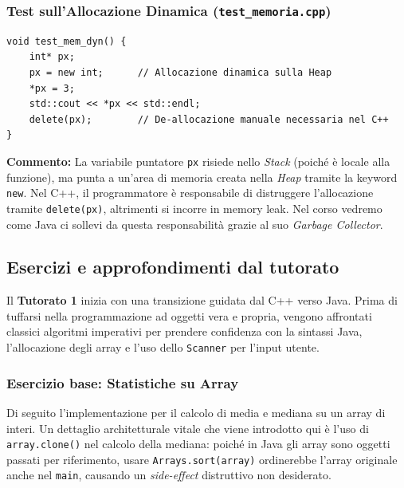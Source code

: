 \documentclass[12pt, a4paper]{article}
\begin{document}
\subsubsection{Test sull'Allocazione Dinamica (\texttt{test\_memoria.cpp})}
\begin{verbatim}
void test_mem_dyn() {
    int* px;
    px = new int;      // Allocazione dinamica sulla Heap
    *px = 3;
    std::cout << *px << std::endl;
    delete(px);        // De-allocazione manuale necessaria nel C++
}
\end{verbatim}
\textbf{Commento:} La variabile puntatore \texttt{px} risiede nello \textit{Stack} (poiché è locale alla funzione), ma punta a un'area di memoria creata nella \textit{Heap} tramite la keyword \texttt{new}. Nel C++, il programmatore è responsabile di distruggere l'allocazione tramite \texttt{delete(px)}, altrimenti si incorre in memory leak. Nel corso vedremo come Java ci sollevi da questa responsabilità grazie al suo \textit{Garbage Collector}.

\subsection{Esercizi e approfondimenti dal tutorato}
Il \textbf{Tutorato 1} inizia con una transizione guidata dal C++ verso Java. Prima di tuffarsi nella programmazione ad oggetti vera e propria, vengono affrontati classici algoritmi imperativi per prendere confidenza con la sintassi Java, l'allocazione degli array e l'uso dello \texttt{Scanner} per l'input utente.

\subsubsection{Esercizio base: Statistiche su Array}
Di seguito l'implementazione per il calcolo di media e mediana su un array di interi. Un dettaglio architetturale vitale che viene introdotto qui è l'uso di \texttt{array.clone()} nel calcolo della mediana: poiché in Java gli array sono oggetti passati per riferimento, usare \texttt{Arrays.sort(array)} ordinerebbe l'array originale anche nel \texttt{main}, causando un \textit{side-effect} distruttivo non desiderato.
\end{document}
